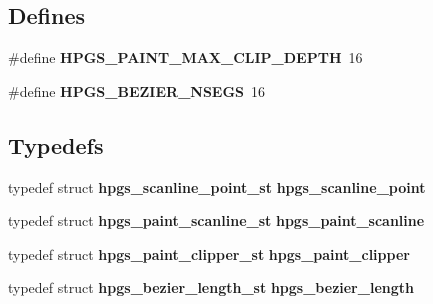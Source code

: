 \subsection*{Defines}
\begin{DoxyCompactItemize}
\item 
\#define {\bfseries HPGS\_\-PAINT\_\-MAX\_\-CLIP\_\-DEPTH}~16\label{group__paint__device_gaf6c109765736c6286c304392398ab3c5}

\item 
\#define {\bfseries HPGS\_\-BEZIER\_\-NSEGS}~16\label{group__path_gac1e1b2309958cace37208a8072ac9f4f}

\end{DoxyCompactItemize}
\subsection*{Typedefs}
\begin{DoxyCompactItemize}
\item 
typedef struct {\bf hpgs\_\-scanline\_\-point\_\-st} {\bfseries hpgs\_\-scanline\_\-point}\label{hpgspaint_8h_ae61f31089d3c7a3bc1ad9cf674dff46b}

\item 
typedef struct {\bf hpgs\_\-paint\_\-scanline\_\-st} {\bfseries hpgs\_\-paint\_\-scanline}\label{hpgspaint_8h_a8972dfb21805e2bc16c8e26e5af30d85}

\item 
typedef struct {\bf hpgs\_\-paint\_\-clipper\_\-st} {\bfseries hpgs\_\-paint\_\-clipper}\label{hpgspaint_8h_a1d21a9e2b67c4475ae1a5180fe718fdc}

\item 
typedef struct {\bf hpgs\_\-bezier\_\-length\_\-st} {\bfseries hpgs\_\-bezier\_\-length}\label{group__path_ga5e084a0203b2fc7fcbe94b5c2a7af9b0}

\end{DoxyCompactItemize}

